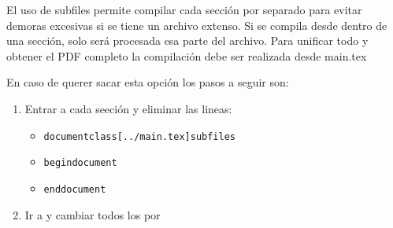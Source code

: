 
El uso de subfiles permite compilar cada sección por separado para evitar demoras excesivas si se tiene un archivo extenso.
Si se compila desde dentro de una sección, solo será procesada esa parte del archivo. Para unificar todo y obtener el PDF completo la compilación debe ser realizada desde main.tex

En caso de querer sacar esta opción los pasos a seguir son:
\begin{enumerate}
    \item Entrar a cada seeción y eliminar las lineas:
        \begin{itemize}
            \item \texttt{documentclass[../main.tex]{subfiles}}
            \item \texttt{begin{document}}
            \item \texttt{end{document}}
        \end{itemize}
    \item Ir a  y cambiar todos los  por 
\end{enumerate}

